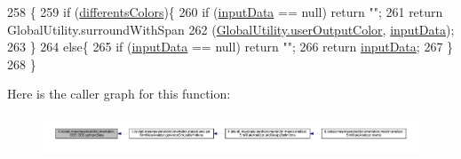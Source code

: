 \begin{DoxyCode}
258                                        \{
259         \textcolor{keywordflow}{if} (\hyperlink{classit_1_1isislab_1_1masonassisteddocumentation_1_1_o_d_d_1_1_o_d_d_a5e99cecaa409eacae00aceb1bbd62a56}{differentsColors})\{
260             \textcolor{keywordflow}{if} (\hyperlink{classit_1_1isislab_1_1masonassisteddocumentation_1_1_o_d_d_1_1_o_d_d_a80d3020ab16a70890782d07321f84644}{inputData} == null) \textcolor{keywordflow}{return} \textcolor{stringliteral}{""};
261             \textcolor{keywordflow}{return} GlobalUtility.surroundWithSpan
262                 (\hyperlink{classit_1_1isislab_1_1masonassisteddocumentation_1_1mason_1_1analizer_1_1_global_utility_a0fcb324ae33eb93bd5b9177e342ecc82}{GlobalUtility.userOutputColor}, 
      \hyperlink{classit_1_1isislab_1_1masonassisteddocumentation_1_1_o_d_d_1_1_o_d_d_a80d3020ab16a70890782d07321f84644}{inputData});
263         \}
264         \textcolor{keywordflow}{else}\{
265             \textcolor{keywordflow}{if} (\hyperlink{classit_1_1isislab_1_1masonassisteddocumentation_1_1_o_d_d_1_1_o_d_d_a80d3020ab16a70890782d07321f84644}{inputData} == null) \textcolor{keywordflow}{return} \textcolor{stringliteral}{""};
266             \textcolor{keywordflow}{return} \hyperlink{classit_1_1isislab_1_1masonassisteddocumentation_1_1_o_d_d_1_1_o_d_d_a80d3020ab16a70890782d07321f84644}{inputData};
267         \}
268     \}
\end{DoxyCode}


Here is the caller graph for this function\-:\nopagebreak
\begin{figure}[H]
\begin{center}
\leavevmode
\includegraphics[width=350pt]{classit_1_1isislab_1_1masonassisteddocumentation_1_1_o_d_d_1_1_o_d_d_a733268d9fc89d2fce7c31bdc1dbc8b15_icgraph}
\end{center}
\end{figure}


